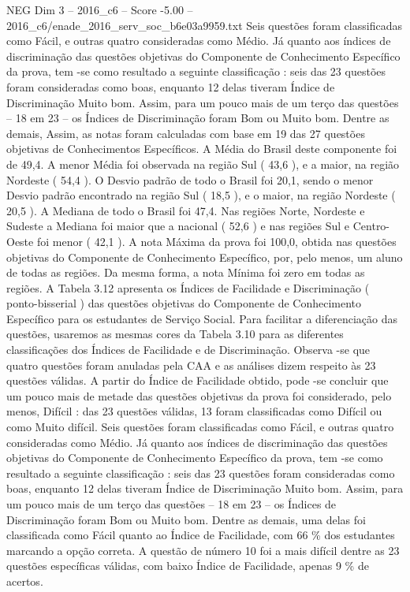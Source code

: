\begin{textsample}{NEG Dim 3 – 2016\_c6 – Score -5.00 – 2016\_c6/enade\_2016\_serv\_soc\_b6e03a9959.txt}
Seis questões foram classificadas como Fácil, e outras quatro consideradas como Médio.
Já quanto aos índices de discriminação das questões objetivas do Componente de Conhecimento Específico da prova, tem -se como resultado a seguinte classificação : seis das 23 questões foram consideradas como boas, enquanto 12 delas tiveram Índice de Discriminação Muito bom.
Assim, para um pouco mais de um terço das questões – 18 em 23 – os Índices de Discriminação foram Bom ou Muito bom.
Dentre as demais, Assim, as notas foram calculadas com base em 19 das 27 questões objetivas de Conhecimentos Específicos.
A Média do Brasil deste componente foi de 49,4.
A menor Média foi observada na região Sul ( 43,6 ), e a maior, na região Nordeste ( 54,4 ).
O Desvio padrão de todo o Brasil foi 20,1, sendo o menor Desvio padrão encontrado na região Sul ( 18,5 ), e o maior, na região Nordeste ( 20,5 ).
A Mediana de todo o Brasil foi 47,4.
Nas regiões Norte, Nordeste e Sudeste a Mediana foi maior que a nacional ( 52,6 ) e nas regiões Sul e Centro-Oeste foi menor ( 42,1 ).
A nota Máxima da prova foi 100,0, obtida nas questões objetivas do Componente de Conhecimento Específico, por, pelo menos, um aluno de todas as regiões.
Da mesma forma, a nota Mínima foi zero em todas as regiões.
A Tabela 3.12 apresenta os Índices de Facilidade e Discriminação ( ponto-bisserial ) das questões objetivas do Componente de Conhecimento Específico para os estudantes de Serviço Social.
Para facilitar a diferenciação das questões, usaremos as mesmas cores da Tabela 3.10 para as diferentes classificações dos Índices de Facilidade e de Discriminação.
Observa -se que quatro questões foram anuladas pela CAA e as análises dizem respeito às 23 questões válidas.
A partir do Índice de Facilidade obtido, pode -se concluir que um pouco mais de metade das questões objetivas da prova foi considerado, pelo menos, Difícil : das 23 questões válidas, 13 foram classificadas como Difícil ou como Muito difícil.
Seis questões foram classificadas como Fácil, e outras quatro consideradas como Médio.
Já quanto aos índices de discriminação das questões objetivas do Componente de Conhecimento Específico da prova, tem -se como resultado a seguinte classificação : seis das 23 questões foram consideradas como boas, enquanto 12 delas tiveram Índice de Discriminação Muito bom.
Assim, para um pouco mais de um terço das questões – 18 em 23 – os Índices de Discriminação foram Bom ou Muito bom.
Dentre as demais, uma delas foi classificada como Fácil quanto ao Índice de Facilidade, com 66 \% dos estudantes marcando a opção correta.
A questão de número 10 foi a mais difícil dentre as 23 questões específicas válidas, com baixo Índice de Facilidade, apenas 9 \% de acertos.

\end{textsample}

